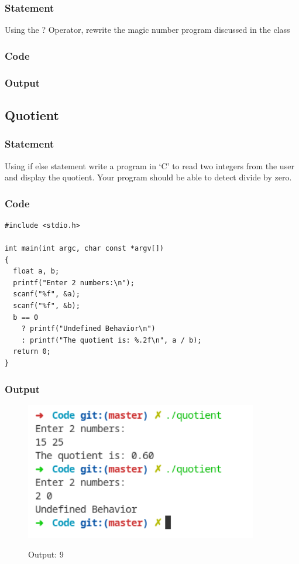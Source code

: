 \subsubsection{Statement}
Using the ? Operator, rewrite the magic number program discussed in the class

\subsubsection{Code}

\subsubsection{Output}

\pagebreak
\subsection{Quotient}
\subsubsection{Statement}
Using if else statement write a program in ‘C’ to read two integers from the user and display
the quotient. Your program should be able to detect divide by zero.
\subsubsection{Code}
\begin{verbatim} 
#include <stdio.h>

int main(int argc, char const *argv[])
{
  float a, b;
  printf("Enter 2 numbers:\n");
  scanf("%f", &a);
  scanf("%f", &b);
  b == 0 
    ? printf("Undefined Behavior\n") 
    : printf("The quotient is: %.2f\n", a / b);
  return 0;
}

\end{verbatim}
\subsubsection{Output}
\begin{figure}[!htb]
  \centering
  \includegraphics[width=4in]{Images/quotient.png}
  \label{output:9}
  \caption{Output: 9}
\end{figure}


